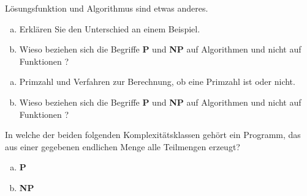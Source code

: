 \begin{card}
	Lösungsfunktion und Algorithmus sind etwas anderes.
	\begin{enumerate}[a)]
	\item Erklären Sie den Unterschied an einem Beispiel.
	\item Wieso beziehen sich die Begriffe	\textbf{P} und \textbf{NP} auf Algorithmen und nicht auf Funktionen ? 
	\end{enumerate}
	\hr
	\begin{enumerate}[a)]
	\item Primzahl und Verfahren zur Berechnung, ob eine Primzahl ist oder nicht.
	\item Wieso beziehen sich die Begriffe	\textbf{P} und \textbf{NP} auf Algorithmen und nicht auf Funktionen ? 
	\end{enumerate}
	\hr
\end{card}

\begin{card}
	In welche der beiden folgenden Komplexitätsklassen gehört ein Programm, das aus einer
	gegebenen endlichen Menge alle Teilmengen erzeugt?
	\begin{enumerate}[a)]
	\item \textbf{P}
	\item \textbf{NP}
	\end{enumerate}
	\hr
\end{card}

